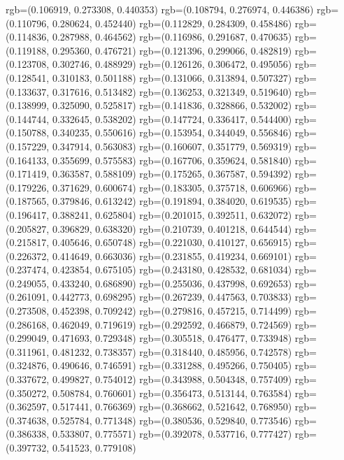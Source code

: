 {{{					rgb=(0.106919, 0.273308, 0.440353)
					rgb=(0.108794, 0.276974, 0.446386)
					rgb=(0.110796, 0.280624, 0.452440)
					rgb=(0.112829, 0.284309, 0.458486)
					rgb=(0.114836, 0.287988, 0.464562)
					rgb=(0.116986, 0.291687, 0.470635)
					rgb=(0.119188, 0.295360, 0.476721)
					rgb=(0.121396, 0.299066, 0.482819)
					rgb=(0.123708, 0.302746, 0.488929)
					rgb=(0.126126, 0.306472, 0.495056)
					rgb=(0.128541, 0.310183, 0.501188)
					rgb=(0.131066, 0.313894, 0.507327)
					rgb=(0.133637, 0.317616, 0.513482)
					rgb=(0.136253, 0.321349, 0.519640)
					rgb=(0.138999, 0.325090, 0.525817)
					rgb=(0.141836, 0.328866, 0.532002)
					rgb=(0.144744, 0.332645, 0.538202)
					rgb=(0.147724, 0.336417, 0.544400)
					rgb=(0.150788, 0.340235, 0.550616)
					rgb=(0.153954, 0.344049, 0.556846)
					rgb=(0.157229, 0.347914, 0.563083)
					rgb=(0.160607, 0.351779, 0.569319)
					rgb=(0.164133, 0.355699, 0.575583)
					rgb=(0.167706, 0.359624, 0.581840)
					rgb=(0.171419, 0.363587, 0.588109)
					rgb=(0.175265, 0.367587, 0.594392)
					rgb=(0.179226, 0.371629, 0.600674)
					rgb=(0.183305, 0.375718, 0.606966)
					rgb=(0.187565, 0.379846, 0.613242)
					rgb=(0.191894, 0.384020, 0.619535)
					rgb=(0.196417, 0.388241, 0.625804)
					rgb=(0.201015, 0.392511, 0.632072)
					rgb=(0.205827, 0.396829, 0.638320)
					rgb=(0.210739, 0.401218, 0.644544)
					rgb=(0.215817, 0.405646, 0.650748)
					rgb=(0.221030, 0.410127, 0.656915)
					rgb=(0.226372, 0.414649, 0.663036)
					rgb=(0.231855, 0.419234, 0.669101)
					rgb=(0.237474, 0.423854, 0.675105)
					rgb=(0.243180, 0.428532, 0.681034)
					rgb=(0.249055, 0.433240, 0.686890)
					rgb=(0.255036, 0.437998, 0.692653)
					rgb=(0.261091, 0.442773, 0.698295)
					rgb=(0.267239, 0.447563, 0.703833)
					rgb=(0.273508, 0.452398, 0.709242)
					rgb=(0.279816, 0.457215, 0.714499)
					rgb=(0.286168, 0.462049, 0.719619)
					rgb=(0.292592, 0.466879, 0.724569)
					rgb=(0.299049, 0.471693, 0.729348)
					rgb=(0.305518, 0.476477, 0.733948)
					rgb=(0.311961, 0.481232, 0.738357)
					rgb=(0.318440, 0.485956, 0.742578)
					rgb=(0.324876, 0.490646, 0.746591)
					rgb=(0.331288, 0.495266, 0.750405)
					rgb=(0.337672, 0.499827, 0.754012)
					rgb=(0.343988, 0.504348, 0.757409)
					rgb=(0.350272, 0.508784, 0.760601)
					rgb=(0.356473, 0.513144, 0.763584)
					rgb=(0.362597, 0.517441, 0.766369)
					rgb=(0.368662, 0.521642, 0.768950)
					rgb=(0.374638, 0.525784, 0.771348)
					rgb=(0.380536, 0.529840, 0.773546)
					rgb=(0.386338, 0.533807, 0.775571)
					rgb=(0.392078, 0.537716, 0.777427)
					rgb=(0.397732, 0.541523, 0.779108)
}}}
